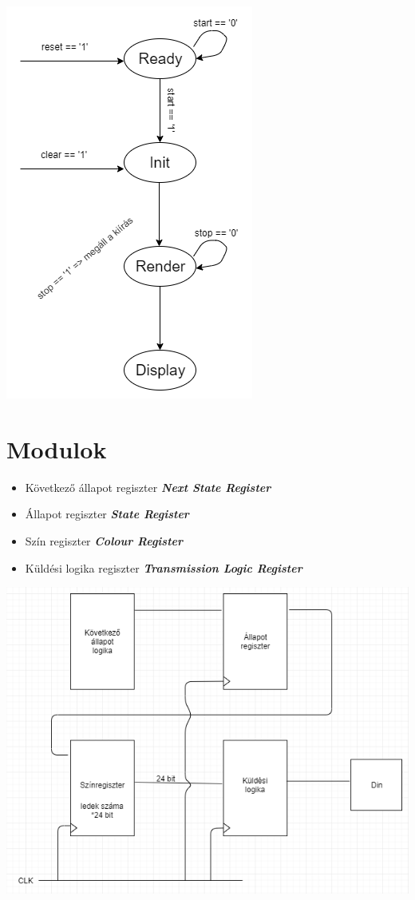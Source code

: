 \documentclass[10pt]{article} %
\begin{document}
\includegraphics[scale=0.5]{allapotdiagram.png}

\section{Modulok}

\begin{itemize}
\item Következő állapot regiszter \textbf{\textit{Next State Register}}
\item Állapot regiszter \textbf{\textit{State Register}}
\item Szín regiszter \textbf{\textit{Colour Register}}
\item Küldési logika regiszter \textbf{\textit{Transmission Logic Register}}
\end{itemize}

\includegraphics[scale=0.5]{tombvazlat.png}
\end{document}
